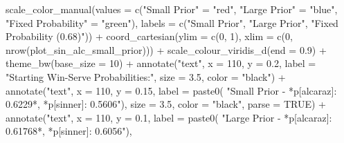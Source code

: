 \documentclass[
  letterpaper,
  DIV=11,
  numbers=noendperiod]{scrartcl}
\newenvironment{Shaded}{\begin{snugshade}}{\end{snugshade}}
\newcommand{\AttributeTok}[1]{\textcolor[rgb]{0.40,0.45,0.13}{#1}}
\newcommand{\ConstantTok}[1]{\textcolor[rgb]{0.56,0.35,0.01}{#1}}
\newcommand{\DecValTok}[1]{\textcolor[rgb]{0.68,0.00,0.00}{#1}}
\newcommand{\FloatTok}[1]{\textcolor[rgb]{0.68,0.00,0.00}{#1}}
\newcommand{\FunctionTok}[1]{\textcolor[rgb]{0.28,0.35,0.67}{#1}}
\newcommand{\NormalTok}[1]{\textcolor[rgb]{0.00,0.23,0.31}{#1}}
\newcommand{\OtherTok}[1]{\textcolor[rgb]{0.00,0.23,0.31}{#1}}
\newcommand{\SpecialCharTok}[1]{\textcolor[rgb]{0.37,0.37,0.37}{#1}}
\newcommand{\StringTok}[1]{\textcolor[rgb]{0.13,0.47,0.30}{#1}}
\begin{document}
\begin{Shaded}
\begin{Highlighting}[]
  \FunctionTok{scale\_color\_manual}\NormalTok{(}\AttributeTok{values =} \FunctionTok{c}\NormalTok{(}\StringTok{"Small Prior"} \OtherTok{=} \StringTok{"red"}\NormalTok{, }
                                \StringTok{"Large Prior"} \OtherTok{=} \StringTok{"blue"}\NormalTok{, }
                                \StringTok{"Fixed Probability"} \OtherTok{=} \StringTok{"green"}\NormalTok{),}
                     \AttributeTok{labels =} \FunctionTok{c}\NormalTok{(}\StringTok{"Small Prior"}\NormalTok{, }
                                \StringTok{"Large Prior"}\NormalTok{, }
                                \StringTok{"Fixed Probability (0.68)"}\NormalTok{)) }\SpecialCharTok{+}
  \FunctionTok{coord\_cartesian}\NormalTok{(}\AttributeTok{ylim =} \FunctionTok{c}\NormalTok{(}\DecValTok{0}\NormalTok{, }\DecValTok{1}\NormalTok{),}
                  \AttributeTok{xlim =} \FunctionTok{c}\NormalTok{(}\DecValTok{0}\NormalTok{, }\FunctionTok{nrow}\NormalTok{(plot\_sin\_alc\_small\_prior))) }\SpecialCharTok{+}
  \FunctionTok{scale\_colour\_viridis\_d}\NormalTok{(}\AttributeTok{end =} \FloatTok{0.9}\NormalTok{) }\SpecialCharTok{+}
  \FunctionTok{theme\_bw}\NormalTok{(}\AttributeTok{base\_size =} \DecValTok{10}\NormalTok{) }\SpecialCharTok{+}
  \FunctionTok{annotate}\NormalTok{(}\StringTok{"text"}\NormalTok{, }\AttributeTok{x =} \DecValTok{110}\NormalTok{, }\AttributeTok{y =} \FloatTok{0.2}\NormalTok{, }
           \AttributeTok{label =} \StringTok{"Starting Win{-}Serve Probabilities:"}\NormalTok{, }
           \AttributeTok{size =} \FloatTok{3.5}\NormalTok{, }\AttributeTok{color =} \StringTok{"black"}\NormalTok{) }\SpecialCharTok{+}
  \FunctionTok{annotate}\NormalTok{(}\StringTok{"text"}\NormalTok{, }\AttributeTok{x =} \DecValTok{110}\NormalTok{, }\AttributeTok{y =} \FloatTok{0.15}\NormalTok{, }
           \AttributeTok{label =} \FunctionTok{paste0}\NormalTok{(}
             \StringTok{"\textquotesingle{}Small Prior {-} \textquotesingle{}*p[alcaraz]: 0.6229*\textquotesingle{}, \textquotesingle{}*p[sinner]: 0.5606"}\NormalTok{), }
           \AttributeTok{size =} \FloatTok{3.5}\NormalTok{, }\AttributeTok{color =} \StringTok{"black"}\NormalTok{, }\AttributeTok{parse =} \ConstantTok{TRUE}\NormalTok{) }\SpecialCharTok{+}
  \FunctionTok{annotate}\NormalTok{(}\StringTok{"text"}\NormalTok{, }\AttributeTok{x =} \DecValTok{110}\NormalTok{, }\AttributeTok{y =} \FloatTok{0.1}\NormalTok{, }
           \AttributeTok{label =} \FunctionTok{paste0}\NormalTok{(}
             \StringTok{"\textquotesingle{}Large Prior {-} \textquotesingle{}*p[alcaraz]: 0.61768*\textquotesingle{}, \textquotesingle{}*p[sinner]: 0.6056"}\NormalTok{), }

\end{Highlighting}
\end{Shaded}
\end{document}

